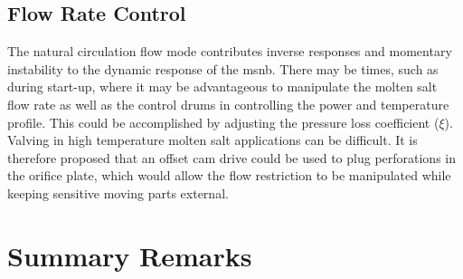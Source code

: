 \subsection{Flow Rate Control}
The natural circulation flow mode contributes inverse responses and momentary instability to the dynamic response of the \acs{msnb}. There may be times, such as during start-up, where it may be advantageous to manipulate the molten salt flow rate as well as the control drums in controlling the power and temperature profile. This could be accomplished by adjusting the pressure loss coefficient ($\xi$). Valving in high temperature molten salt applications can be difficult. It is therefore proposed that an offset cam drive could be used to plug perforations in the orifice plate, which would allow the flow restriction to be manipulated while keeping sensitive moving parts external.

\section{Summary Remarks}